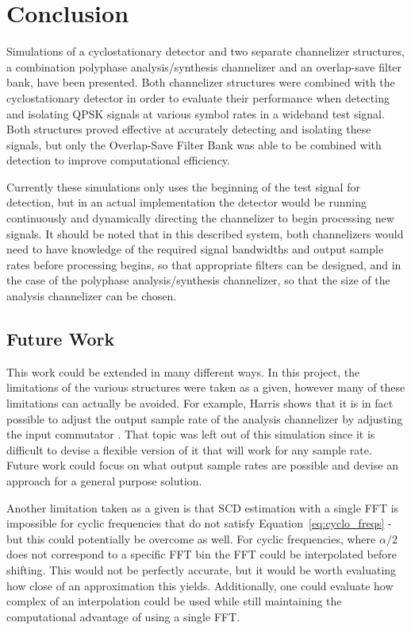 \documentclass[12pt]{report}
\begin{document}
\chapter{Conclusion}
\label{sec:conclusion}
Simulations of a cyclostationary detector and two separate channelizer
structures, a combination polyphase analysis/synthesis channelizer and an
overlap-save filter bank, have been presented. Both channelizer structures
were combined with the cyclostationary detector in order to evaluate their
performance when detecting and isolating QPSK signals at various symbol rates
in a wideband test signal. Both structures proved effective at accurately
detecting and isolating these signals, but only the Overlap-Save Filter Bank
was able to be combined with detection to improve computational efficiency.

Currently these simulations only uses the beginning of the test signal for
detection, but in an actual implementation the detector would be running
continuously and dynamically directing the channelizer to begin processing new
signals. It should be noted that in this described system, both channelizers would
need to have knowledge of the required signal bandwidths and output sample
rates before processing begins, so that appropriate filters can be designed, and
in the case of the polyphase analysis/synthesis channelizer, so that the size
of the analysis channelizer can be chosen.

\section{Future Work}
This work could be extended in many different ways. In this project, the
limitations of the various structures were taken as a given, however many of
these limitations can actually be avoided. For example, Harris shows that it is
in fact possible to adjust the output sample rate of the analysis channelizer
by adjusting the input commutator \cite{Harris1}. That topic was left out of this
simulation since it is difficult to devise a flexible version of it that will
work for any sample rate. Future work could focus on what output sample rates
are possible and devise an approach for a general purpose solution.

Another limitation taken as a given is that SCD estimation with a single FFT is
impossible for cyclic frequencies that do not satisfy
Equation~\ref{eq:cyclo_freqs} - but this could potentially be overcome as well.
For cyclic frequencies, where $\alpha/2$ does not correspond to a specific FFT
bin the FFT could be interpolated before shifting. This would not be perfectly
accurate, but it would be worth evaluating how close of an approximation this
yields. Additionally, one could evaluate how complex of an interpolation could
be used while still maintaining the computational advantage of using a single FFT.
\end{document}
